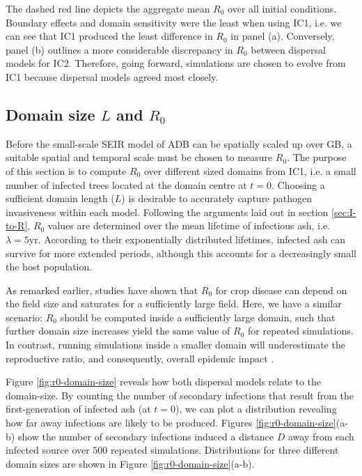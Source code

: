 The dashed red line depicts the aggregate mean $R_0$ over all initial conditions. Boundary effects and domain sensitivity were the least when using IC1, i.e. we can see that IC1 produced the least difference in $R_0$ in panel (a). Conversely, panel (b) outlines a more considerable discrepancy in $R_0$ between dispersal models for IC2. 
Therefore, going forward, simulations are chosen to evolve from IC1 because dispersal models agreed most closely.

\subsection{Domain size $L$ and $R_0$}
\label{sec:r0-vs-L}

Before the small-scale SEIR model of ADB can be spatially scaled up over GB, a suitable spatial and temporal 
scale must be chosen to measure $R_0$. The purpose of this section is to compute $R_0$ over different sized 
domains from IC1, i.e. a small number of infected trees located at the domain centre at $t=0$.
Choosing a sufficient domain length ($L$) is desirable to accurately capture pathogen invasiveness within each model.
Following the arguments laid out in section \ref{sec:I-to-R}, $R_0$ values are determined over the mean 
lifetime of infectious ash, i.e. $\lambda=5\mathrm{yr}$. According to their exponentially distributed lifetimes, 
infected ash can survive for more extended periods, although this accounts for a decreasingly small  the host population.

As remarked earlier, studies have shown that $R_0$ for crop disease can depend on the field size \cite{mikaberidze2016invasiveness} 
and saturates for a sufficiently large field. Here, we have a similar scenario: $R_0$ should be computed inside a sufficiently large domain,
such that further domain size increases yield the same value of $R_0$ for repeated simulations. In contrast, running simulations inside a smaller domain will 
underestimate the reproductive ratio, and consequently, overall epidemic impact \cite{R0-perc-ref, time-varying-infectivity}.

Figure \ref{fig:r0-domain-size} reveals how both dispersal models relate to the domain-size.
By counting the number of secondary infections that result from the first-generation of infected ash (at $t=0$), we can plot a distribution revealing how far away infections are likely to be produced.
Figures \ref{fig:r0-domain-size}(a-b) show the number of secondary infections induced a distance $D$ away from each infected source over $500$ repeated simulations.
Distributions for three different domain sizes are shown in Figure \ref{fig:r0-domain-size}(a-b).


